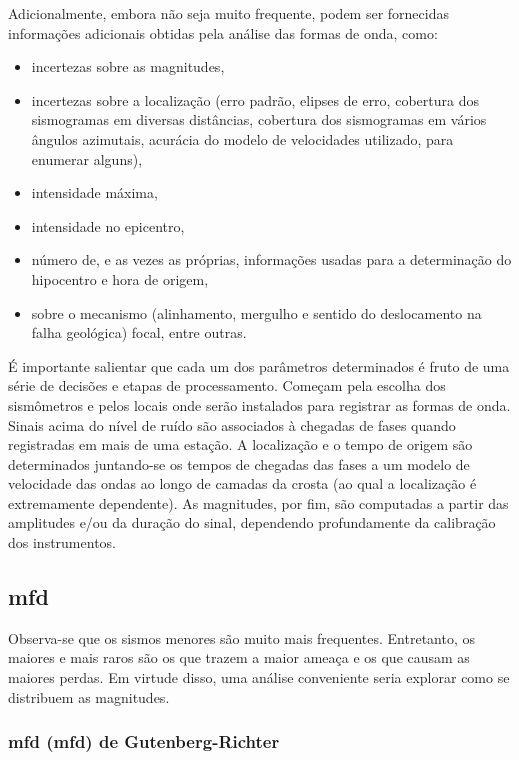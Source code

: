 Adicionalmente, embora não seja muito frequente, podem ser fornecidas informações adicionais obtidas pela análise das
formas de onda, como:

\begin{itemize}\setlength{\itemsep}{0em}
	\item incertezas sobre as magnitudes,
	\item incertezas sobre a localização (erro padrão, elipses de erro, cobertura dos sismogramas em diversas distâncias, cobertura
	dos sismogramas em vários ângulos azimutais, acurácia do modelo de velocidades utilizado, para enumerar alguns),
	\item intensidade máxima,
	\item intensidade no epicentro,
	\item número de, e as vezes as próprias, informações usadas para a determinação do hipocentro e hora de origem,
	\item sobre o mecanismo (alinhamento, mergulho e sentido do deslocamento na falha geológica) focal, entre outras.
\end{itemize}

É importante salientar \citep{woessner_2010} que cada um dos parâmetros determinados é fruto de uma série de decisões
e etapas de processamento. Começam pela escolha dos sismômetros e pelos locais onde serão instalados para registrar as
formas de onda. Sinais acima do nível de ruído são associados à chegadas de fases quando registradas em mais de uma estação.
A localização e o tempo de origem são determinados juntando-se os tempos de chegadas das fases a um modelo de velocidade
das ondas ao longo de camadas da crosta (ao qual a localização é extremamente dependente). As magnitudes, por fim, são
computadas a partir das amplitudes e/ou da duração do sinal, dependendo profundamente da calibração dos instrumentos.



\subsection{\glsdesc{mfd}}
\label{sec:mfd}

Observa-se que os sismos menores são muito mais frequentes.
Entretanto, os maiores e mais raros são os que trazem a maior ameaça e os que causam as maiores perdas.
Em virtude disso, uma análise conveniente seria explorar como se distribuem as magnitudes.

\subsubsection{\glsdesc*{mfd} (\gls{mfd}) de Gutenberg-Richter}
\label{sec:grmfd}

